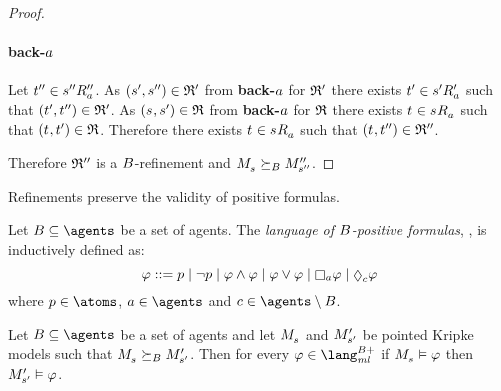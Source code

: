 \begin{proof}
    \paragraph{back-$a$}
    Let ${t}^{\prime\prime} \in {{s}^{\prime\prime}} {R^{\prime\prime}_{a}}$.
    As $({s}^{\prime}, {s}^{\prime\prime}) \in \mathfrak{R}'$ from {\bf back-$a$} for $\mathfrak{R}'$ there exists ${t}^{\prime} \in {{s}^{\prime}} {R^{\prime}_{a}}$ such that $({t}^{\prime}, {t}^{\prime\prime}) \in \mathfrak{R}'$.
    As $(\kStateS, \kStateSP) \in \refinement$ from {\bf back-$a$} for $\mathfrak{R}$ there exists $\kStateT \in \kSuccessorsA{\kStateS}$ such that $(\kStateT, \kStateTP) \in \refinement$.
    Therefore there exists $\kStateT \in \kSuccessorsA{\kStateS}$ such that $(\kStateT, \kStateTPP) \in \refinement''$.

    Therefore $\mathfrak{R}''$ is a $B$-refinement and $\kPModel{\kStateS} \simulatesBs \kPModelPP{\kStateSPP}$. 
\end{proof}

Refinements preserve the validity of positive formulas.

\begin{definition}
Let $\agentsB \subseteq \agents$ be a set of agents.
The {\em language of $B$-positive formulas}, \langMlPlusBs{}, is inductively defined as:
$$
\phi ::= 
    \atomP \mid
    \lnot \atomP \mid
    \phi \land \phi \mid
    \phi \lor \phi \mid
    \necessaryA \phi \mid
    \possibleC \phi
$$
where $\atomP \in \atoms$, $\agentA \in \agents$ and $\agentC \in \agents \setminus \agentsB$.
\end{definition}

\begin{proposition}\label{refinements-preserve-positive}
Let $\agentsB \subseteq \agents$ be a set of agents and let $\kPModel{\kStateS}$ and ${M^{\prime}_{{s}^{\prime}}}$ be pointed Kripke models such that $\kPModel{\kStateS} \simulatesBs \kPModelP{\kStateSP}$.
Then for every $\phi \in \langMlPlusBs$
if $\kPModel{\kStateS} \entails \phi$ then ${M^{\prime}_{{s}^{\prime}}} \vDash \varphi$.
\end{proposition}

